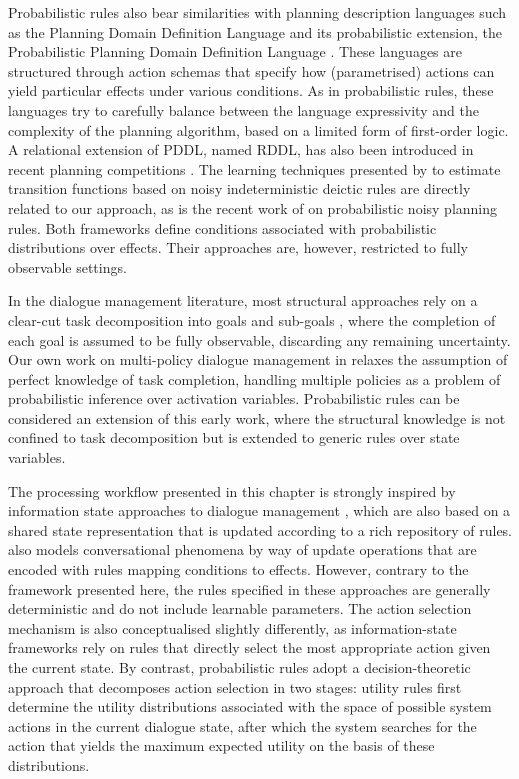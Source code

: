 Probabilistic rules also bear similarities with planning description languages such as the Planning Domain Definition Language \citep[PDDL, see ][]{mcdermott1998} and its probabilistic extension, the Probabilistic Planning Domain Definition Language \citep[PPDDL, see ][]{younes2004ppddl1}.  These languages are structured through action schemas that specify how (parametrised) actions can yield particular effects under various conditions. As in probabilistic rules, these languages try to carefully balance between the language expressivity and the complexity of the planning algorithm, based on a limited form of first-order logic. A relational extension of PDDL, named RDDL, has also been introduced in recent planning competitions \citep{Sanner:RDDL}. The learning techniques presented by \cite{PasulaZK07} to estimate transition functions based on noisy indeterministic deictic rules are directly related to our approach, as is the recent work of \cite{lang10jair} on probabilistic noisy planning rules.   Both frameworks define conditions associated with probabilistic distributions over effects. Their approaches are, however, restricted to fully observable settings. 

In the dialogue management literature, most structural approaches rely on a clear-cut task decomposition into goals and sub-goals \citep{Allen:2000:AGD:973935.973937,Steedman-Petrick:07,Bohus:2009}, where the completion of each goal is assumed to be fully observable, discarding any remaining uncertainty.  Our own work on multi-policy dialogue management in \cite{multipolicy-sigdial2011} relaxes the assumption of perfect knowledge of task completion, handling multiple policies as a problem of probabilistic inference over activation variables.  Probabilistic rules can be considered an extension of this early work, where the structural knowledge is not confined to task decomposition but is extended to generic rules over state variables.  

The processing workflow presented in this chapter is strongly inspired by information state approaches to dialogue management \citep{Larsson:2000,Bos2003}, which are also based on a shared state representation that is updated according to a rich repository of rules.  \cite{Ginzburg2012} also models conversational phenomena by way of update operations that are encoded with rules mapping conditions to effects. However, contrary to the framework presented here, the rules specified in these approaches are generally deterministic and do not include learnable parameters. The action selection mechanism is also conceptualised slightly differently, as information-state frameworks rely on rules that directly select the most appropriate action given the current state. By contrast, probabilistic rules adopt a decision-theoretic approach that decomposes action selection in two stages: utility rules first determine the utility distributions associated with the space of possible system actions in the current dialogue state, after which the system searches for the action that yields the maximum expected utility on the basis of these distributions.  

